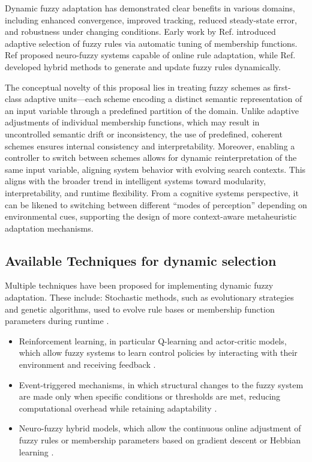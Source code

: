 Dynamic fuzzy adaptation has demonstrated clear benefits in various domains, including enhanced convergence, improved tracking, reduced steady-state error, and robustness under changing conditions. Early work by Ref. \parencite{hirakawa2002selection} introduced adaptive selection of fuzzy rules via automatic tuning of membership functions. Ref \parencite{lin1991neural} proposed neuro-fuzzy systems capable of online rule adaptation, while Ref. \parencite{wang1992generating} developed hybrid methods to generate and update fuzzy rules dynamically.

The conceptual novelty of this proposal lies in treating fuzzy schemes as first-class adaptive units—each scheme encoding a distinct semantic representation of an input variable through a predefined partition of the domain. Unlike adaptive adjustments of individual membership functions, which may result in uncontrolled semantic drift or inconsistency, the use of predefined, coherent schemes ensures internal consistency and interpretability. Moreover, enabling a controller to switch between schemes allows for dynamic reinterpretation of the same input variable, aligning system behavior with evolving search contexts. This aligns with the broader trend in intelligent systems toward modularity, interpretability, and runtime flexibility. From a cognitive systems perspective, it can be likened to switching between different “modes of perception” depending on environmental cues, supporting the design of more context-aware metaheuristic adaptation mechanisms.


\subsection{Available Techniques for dynamic selection}
Multiple techniques have been proposed for implementing dynamic fuzzy adaptation. These include:
Stochastic methods, such as evolutionary strategies and genetic algorithms, used to evolve rule bases or membership function parameters during runtime \parencite{qiu2020event, zhu2020event, haighton2024adaptable}.
\begin{itemize}
    \item Reinforcement learning, in particular Q-learning and actor-critic models, which allow fuzzy systems to learn control policies by interacting with their environment and receiving feedback \parencite{qiu2020event, zhu2020event, haighton2024adaptable}.
    \item Event-triggered mechanisms, in which structural changes to the fuzzy system are made only when specific conditions or thresholds are met, reducing computational overhead while retaining adaptability \parencite{qiu2020event, zhu2020event, haighton2024adaptable, si2022event}.
    \item Neuro-fuzzy hybrid models, which allow the continuous online adjustment of fuzzy rules or membership parameters based on gradient descent or Hebbian learning \parencite{li2023fuzzy, si2022event}.
\end{itemize}

